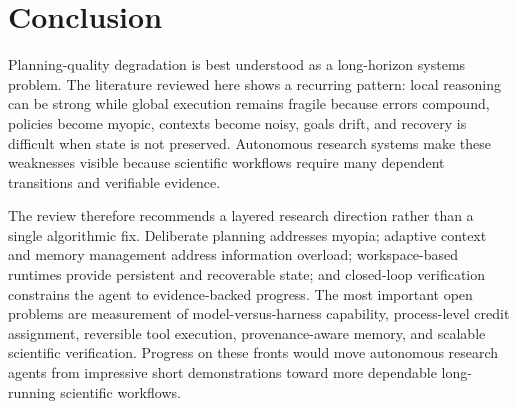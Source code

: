 \documentclass[manuscript,screen]{acmart}
\begin{document}
\section{Conclusion}\label{sec:conclusion}
Planning-quality degradation is best understood as a long-horizon systems problem. The literature reviewed here shows a recurring pattern: local reasoning can be strong while global execution remains fragile because errors compound, policies become myopic, contexts become noisy, goals drift, and recovery is difficult when state is not preserved. Autonomous research systems make these weaknesses visible because scientific workflows require many dependent transitions and verifiable evidence.

The review therefore recommends a layered research direction rather than a single algorithmic fix. Deliberate planning addresses myopia; adaptive context and memory management address information overload; workspace-based runtimes provide persistent and recoverable state; and closed-loop verification constrains the agent to evidence-backed progress. The most important open problems are measurement of model-versus-harness capability, process-level credit assignment, reversible tool execution, provenance-aware memory, and scalable scientific verification. Progress on these fronts would move autonomous research agents from impressive short demonstrations toward more dependable long-running scientific workflows.



\end{document}
